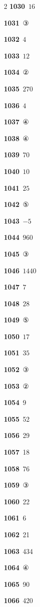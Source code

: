 \documentclass[10pt,a4paper]{article}
\begin{document}
\begin{multicols}{2}
\noindent\textbf{1030}\ $16$\par
\noindent\textbf{1031}\ ③\par
\noindent\textbf{1032}\ $4$\par
\noindent\textbf{1033}\ $12$\par
\noindent\textbf{1034}\ ②\par
\noindent\textbf{1035}\ $270$\par
\noindent\textbf{1036}\ $4$\par
\noindent\textbf{1037}\ ④\par
\noindent\textbf{1038}\ ④\par
\noindent\textbf{1039}\ $70$\par
\noindent\textbf{1040}\ $10$\par
\noindent\textbf{1041}\ $25$\par
\noindent\textbf{1042}\ ⑤\par
\noindent\textbf{1043}\ $-5$\par
\noindent\textbf{1044}\ $960$\par
\noindent\textbf{1045}\ ③\par
\noindent\textbf{1046}\ $1440$\par
\noindent\textbf{1047}\ $7$\par
\noindent\textbf{1048}\ $28$\par
\noindent\textbf{1049}\ ⑤\par
\noindent\textbf{1050}\ $17$\par
\noindent\textbf{1051}\ $35$\par
\noindent\textbf{1052}\ ③\par
\noindent\textbf{1053}\ ②\par
\noindent\textbf{1054}\ 9\par
\noindent\textbf{1055}\ 52\par
\noindent\textbf{1056}\ 29\par
\noindent\textbf{1057}\ 18\par
\noindent\textbf{1058}\ 76\par
\noindent\textbf{1059}\ ③\par
\noindent\textbf{1060}\ 22\par
\noindent\textbf{1061}\ 6\par
\noindent\textbf{1062}\ 21\par
\noindent\textbf{1063}\ 434\par
\noindent\textbf{1064}\ ④\par
\noindent\textbf{1065}\ 90\par
\noindent\textbf{1066}\ 420\par

\end{multicols}
\end{document}
